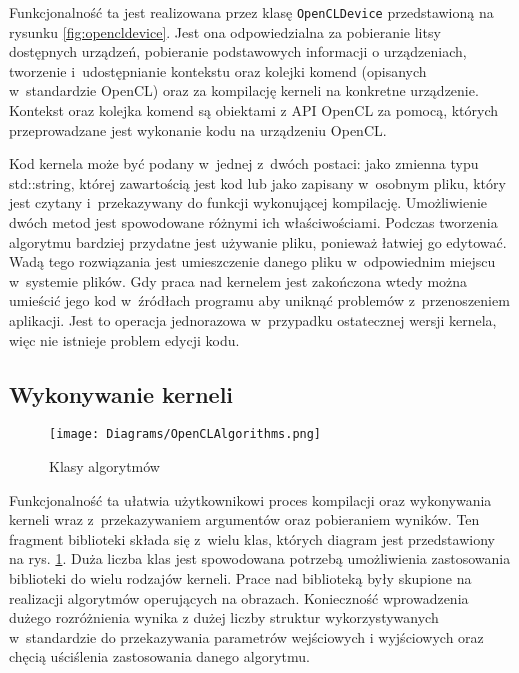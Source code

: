 Funkcjonalność ta jest realizowana przez klasę \texttt{OpenCLDevice} przedstawioną na rysunku \ref{fig:opencldevice}. Jest ona odpowiedzialna za pobieranie litsy dostępnych urządzeń, pobieranie podstawowych informacji o urządzeniach, tworzenie i~udostępnianie kontekstu oraz kolejki komend (opisanych w~standardzie OpenCL) oraz za kompilację kerneli na konkretne urządzenie. Kontekst oraz kolejka komend są obiektami z API OpenCL za pomocą, których przeprowadzane jest wykonanie kodu na urządzeniu OpenCL.

Kod kernela może być podany w~jednej z~dwóch postaci: jako zmienna typu std::string, której zawartością jest kod lub jako zapisany w~osobnym pliku, który jest czytany i~przekazywany do funkcji wykonującej kompilację. Umożliwienie dwóch metod jest spowodowane różnymi ich właściwościami. Podczas tworzenia algorytmu bardziej przydatne jest używanie pliku, ponieważ łatwiej go edytować.  Wadą tego rozwiązania jest umieszczenie danego pliku w~odpowiednim miejscu w~systemie plików. Gdy praca nad kernelem jest zakończona wtedy można umieścić jego kod w~źródłach programu aby uniknąć problemów z~przenoszeniem aplikacji. Jest to operacja jednorazowa w~przypadku ostatecznej wersji kernela, więc nie istnieje problem edycji kodu.

\subsection{Wykonywanie kerneli}
\label{subsec:wykonywaniekerneli}

\begin{figure}
\begin{center}
\texttt{[image: Diagrams/OpenCLAlgorithms.png]}
\end{center}
\caption{Klasy algorytmów}
\label{fig:openclalgorithms}
\end{figure}

Funkcjonalność ta ułatwia użytkownikowi proces kompilacji oraz wykonywania kerneli wraz z~przekazywaniem argumentów oraz pobieraniem wyników. Ten fragment biblioteki składa się z~wielu klas, których diagram jest przedstawiony na rys. \ref{fig:openclalgorithms}. Duża liczba klas jest spowodowana potrzebą umożliwienia zastosowania biblioteki do wielu rodzajów kerneli. Prace nad biblioteką były skupione na realizacji algorytmów operujących na obrazach. Konieczność wprowadzenia dużego rozróżnienia wynika z dużej liczby struktur wykorzystywanych w~standardzie do przekazywania parametrów wejściowych i wyjściowych oraz chęcią uściślenia zastosowania danego algorytmu.

